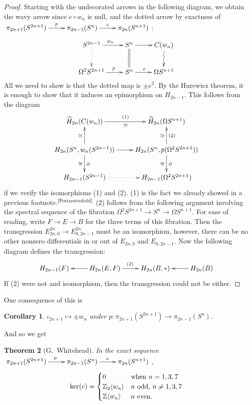 \documentclass{article}
\newcommand{\Z}{\mathbb{Z}}
\newcommand{\Loops}{\Omega}
\newtheorem{thm}{Theorem}[section]
\newtheorem{cor}[thm]{Corollary}
\begin{document}
\begin{proof}
Starting with the undecorated arrows in the following diagram, we obtain the wavy arrow since $e\circ w_n$ is null, and the dotted arrow by exactness of  $\xymatrix{\pi_{2n+1}(S^{2n+1})\ar[r]^{\ \ p}&\pi_{2n-1}(S^n)\ar[r]^e&\pi_{2n}(S^{n+1})}$:
\[\xymatrix{
\ar@{..>}[d]S^{2n-1}  \ar[r]^{w_n} & S^n \ar[r]\ar@{=}[d] & C(w_n)\ar@{~>}[d] \\
\Loops^2 S^{2n+1} \ar[r]^{\ \ \ p} & S^n \ar[r]^{e\ \ } & \Loops S^{n+1}
}\]
All we need to show is that the dotted map is $\pm e^2$. By the Hurewicz theorem, it is enough to show that it induces an epimorphism on $H_{2n-1}$. This follows from the diagram
\[\xymatrix{
\widetilde H_{2n} (C (w_n)) \ar[r]^{(1)}_\cong & \widetilde H_{2n} (\Loops S^{n+1}) \\
H_{2n}(S^n, w_n (S^{2n-1})) \ar[r] 
\ar[u]^{\cong}\ar[d]_\cong^\partial
& H_{2n}(S^n, p(\Loops^2 S^{2n+1}) )
\ar[u]^{\cong}_{(2)}\ar[d]_\cong^\partial
\\
H_{2n-1} (S^{2n-1}) \ar@{..>}[r] & H_{2n-1} (\Loops^2 S^{2n+1})
}\]
if we verify the isomorphisms (1) and (2).  (1) is the fact we already showed in a previous footnote.$^\text{\ref{Fottnoteofold}}$  (2) follows from the following argument involving the spectral sequence of the fibration $\Loops^2 S^{2n+1} \to S^n \to \Loops S^{n+1}$. For ease of reading, write $F\to E\to B$ for the three terms of this fibration. Then the transgression $E^{2n}_{2n,0}\to E^{2n}_{0,2n-1}$ must be an isomorphism, however, there can be no other nonzero differentials in or out of $E_{2n,0}$ and $E_{0,2n-1}$. Now the following diagram defines the transgression:
\[\xymatrix{
H_{2n-1}(F)&\ar[l]H_{2n}(E,F)\ar[r]^{(2)}&H_{2n}(B,*)&%
H_{2n}(B)\ar[l]
}\]
If (2) were not and isomorphism, then the transgression could not be either.
\end{proof}
One consequence of this is
\begin{cor}
$\iota_{2n+1} \mapsto \pm w_n$ under $p:\pi_{2n+1}(S^{2n+1})\to\pi_{2n-1}(S^n)$.
\end{cor}
And so we get
\begin{thm}[G.\ Whitehead]
In the exact sequence 
$\xymatrix{\pi_{2n+1}(S^{2n+1})\ar[r]^{\ p}&\pi_{2n-1}(S^n)\ar[r]^e&\pi_{2n}(S^{n+1})}$\!,
\[
\ker(e) = \begin{cases} 0 & \hbox{when $n = 1, 3, 7$} \\ \Z_2 \langle w_n \rangle & \hbox{$n$ odd, $n\neq1,3,7$} \\ \Z \langle w_n \rangle & \hbox{$n$ even}. \end{cases}
\]
\end{thm}
\end{document}
